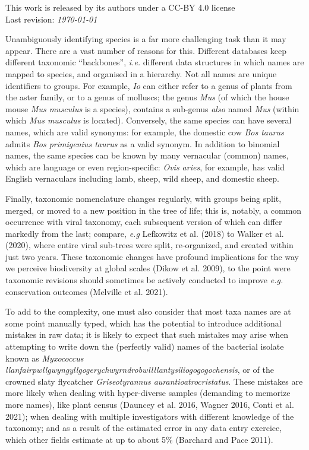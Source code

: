 \documentclass[11pt]{article}
\begin{document}
\vfill
This work is released by its authors under a CC-BY 4.0 license\hfill\ccby\\
Last revision: \emph{\today}

\clearpage
\thispagestyle{empty}

\vfill

\vfill

\clearpage
\linenumbers
\pagestyle{normal}

Unambiguously identifying species is a far more challenging task than it
may appear. There are a vast number of reasons for this. Different
databases keep different taxonomic ``backbones'', \emph{i.e.} different
data structures in which names are mapped to species, and organised in a
hierarchy. Not all names are unique identifiers to groups. For example,
\emph{Io} can either refer to a genus of plants from the aster family,
or to a genus of molluscs; the genus \emph{Mus} (of which the house
mouse \emph{Mus musculus} is a species), contains a sub-genus
\emph{also} named \emph{Mus} (within which \emph{Mus musculus} is
located). Conversely, the same species can have several names, which are
valid synonyms: for example, the domestic cow \emph{Bos taurus} admits
\emph{Bos primigenius taurus} as a valid synonym. In addition to
binomial names, the same species can be known by many vernacular
(common) names, which are language or even region-specific: \emph{Ovis
aries}, for example, has valid English vernaculars including lamb,
sheep, wild sheep, and domestic sheep.

Finally, taxonomic nomenclature changes regularly, with groups being
split, merged, or moved to a new position in the tree of life; this is,
notably, a common occurrence with viral taxonomy, each subsequent
version of which can differ markedly from the last; compare, \emph{e.g}
Lefkowitz et al. (2018) to Walker et al. (2020), where entire viral
sub-trees were split, re-organized, and created within just two years.
These taxonomic changes have profound implications for the way we
perceive biodiversity at global scales (Dikow et al. 2009), to the point
were taxonomic revisions should sometimes be actively conducted to
improve \emph{e.g.} conservation outcomes (Melville et al. 2021).

To add to the complexity, one must also consider that most taxa names
are at some point manually typed, which has the potential to introduce
additional mistakes in raw data; it is likely to expect that such
mistakes may arise when attempting to write down the (perfectly valid)
names of the bacterial isolate known as \emph{Myxococcus
llanfairpwllgwyngyllgogerychwyrndrobwllllantysiliogogogochensis}, or of
the crowned slaty flycatcher \emph{Griseotyrannus
aurantioatrocristatus}. These mistakes are more likely when dealing with
hyper-diverse samples (demanding to memorize more names), like plant
census (Dauncey et al. 2016, Wagner 2016, Conti et al. 2021); when
dealing with multiple investigators with different knowledge of the
taxonomy; and as a result of the estimated error in any data entry
exercice, which other fields estimate at up to about 5\% (Barchard and
Pace 2011).
\end{document}
